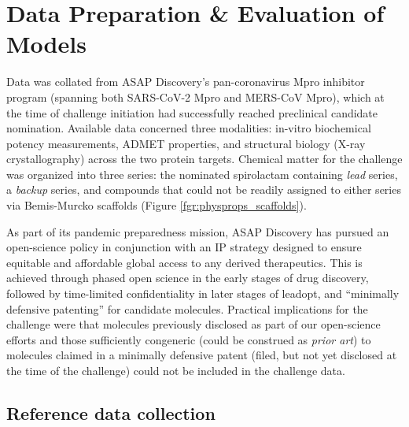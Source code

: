 \documentclass[journal=jcim,manuscript=article]{achemso}
\begin{document}
\section{Data Preparation \& Evaluation of Models}

Data was collated from ASAP Discovery’s pan-coronavirus Mpro inhibitor program (spanning both SARS-CoV-2 Mpro and MERS-CoV Mpro), which at the time of challenge initiation had successfully reached preclinical candidate nomination. Available data concerned three modalities: in-vitro biochemical potency measurements, ADMET properties, and structural biology (X-ray crystallography) across the two protein targets. Chemical matter for the challenge was organized into three series: the nominated spirolactam containing \textit{lead} series, a \textit{backup} series, and compounds that could not be readily assigned to either series via Bemis-Murcko scaffolds\cite{bemis_murcko_1996} (Figure \ref{fgr:physprops_scaffolds}).

As part of its pandemic preparedness mission, ASAP Discovery has pursued an open-science policy in conjunction with an IP strategy designed to ensure equitable and affordable global access to any derived therapeutics. This is achieved through phased open science in the early stages of drug discovery, followed by time-limited confidentiality in later stages of leadopt, and “minimally defensive patenting” for candidate molecules\cite{griffen_2024}. Practical implications for the challenge were that molecules previously disclosed as part of our open-science efforts and those sufficiently congeneric (could be construed as \textit{prior art}\cite{ACS_patents}) to molecules claimed in a minimally defensive patent (filed, but not yet disclosed at the time of the challenge) could not be included in the challenge data.

\subsection{Reference data collection}
\end{document}
